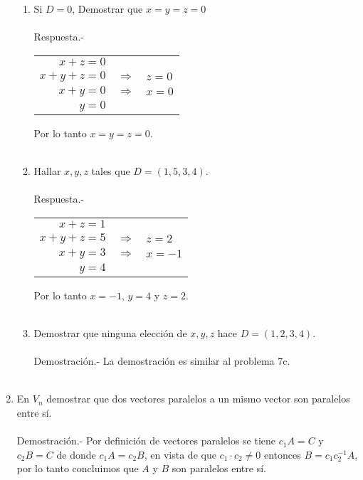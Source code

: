 \begin{enumerate}
\begin{enumerate}[\bfseries a)]
    \item Si $D=0$, Demostrar que $x=y=z=0$\\\\
	Respuesta.-\; 
	\begin{center}
	\begin{tabular}{rcl}
	    $x+z=0$&&\\
	    $x+y+z=0$&$\Longrightarrow$&$z=0$\\
	    $x+y=0$&$\Longrightarrow$&$x=0$\\
	    $y=0$&&\\
	\end{tabular}
	\end{center}
	Por lo tanto $x=y=z=0$.\\\\

    \item Hallar $x,y,z$ tales que $D=(1,5,3,4)$.\\\\
	Respuesta.-\;
	\begin{center}
	\begin{tabular}{rcl}
	 $x+z=1$&&\\
	 $x+y+z=5$&$\Longrightarrow$&$z=2$\\
	 $x+y=3$&$\Longrightarrow$&$x=-1$\\
	 $y=4$&&\\
	\end{tabular}
	\end{center}
	Por lo tanto $x=-1$, $y=4$ y $z=2$.\\\\

    \item Demostrar que ninguna elección de $x,y,z$ hace $D=(1,2,3,4)$.\\\\
	Demostración.-\; La demostración es similar al problema 7c.\\\\

\end{enumerate}

\item En $V_n$ demostrar que dos vectores paralelos a un mismo vector son paralelos entre sí.\\\\
    Demostración.-\; Por definición de vectores paralelos se tiene $c_1A=C$ y $c_2B=C$ de donde $c_1A=c_2B$, en vista de que $c_1\cdot c_2 \neq 0$ entonces $B=c_1c_2^{-1} A$, por lo tanto concluimos que $A$ y $B$ son paralelos entre sí.\\\\ 


\end{enumerate}
